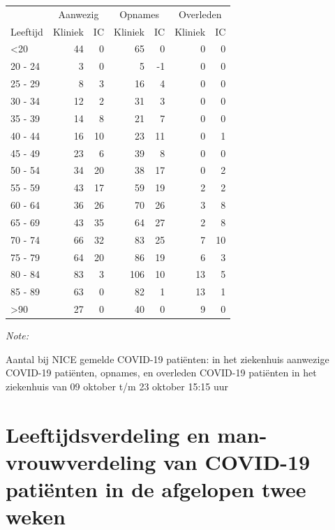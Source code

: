 \documentclass[
  english,
  man,floatsintext]{apa6}
\begin{document}
\begin{table}
\centering\begingroup\fontsize{10}{12}\selectfont

\begin{threeparttable}
\begin{tabular}{lrrrrrr}
\toprule
\multicolumn{1}{c}{ } & \multicolumn{2}{c}{Aanwezig} & \multicolumn{2}{c}{Opnames} & \multicolumn{2}{c}{Overleden} \\
\cmidrule(l{3pt}r{3pt}){2-3} \cmidrule(l{3pt}r{3pt}){4-5} \cmidrule(l{3pt}r{3pt}){6-7}
Leeftijd & Kliniek & IC & Kliniek & IC & Kliniek & IC\\
\midrule
<20 & 44 & 0 & 65 & 0 & 0 & 0\\
20 - 24 & 3 & 0 & 5 & -1 & 0 & 0\\
25 - 29 & 8 & 3 & 16 & 4 & 0 & 0\\
30 - 34 & 12 & 2 & 31 & 3 & 0 & 0\\
35 - 39 & 14 & 8 & 21 & 7 & 0 & 0\\
40 - 44 & 16 & 10 & 23 & 11 & 0 & 1\\
45 - 49 & 23 & 6 & 39 & 8 & 0 & 0\\
50 - 54 & 34 & 20 & 38 & 17 & 0 & 2\\
55 - 59 & 43 & 17 & 59 & 19 & 2 & 2\\
60 - 64 & 36 & 26 & 70 & 26 & 3 & 8\\
65 - 69 & 43 & 35 & 64 & 27 & 2 & 8\\
70 - 74 & 66 & 32 & 83 & 25 & 7 & 10\\
75 - 79 & 64 & 20 & 86 & 19 & 6 & 3\\
80 - 84 & 83 & 3 & 106 & 10 & 13 & 5\\
85 - 89 & 63 & 0 & 82 & 1 & 13 & 1\\
>90 & 27 & 0 & 40 & 0 & 9 & 0\\
\bottomrule
\end{tabular}
\begin{tablenotes}
\item \textit{Note: } 
\item Aantal bij NICE gemelde COVID-19 patiënten: in het ziekenhuis aanwezige COVID-19 patiënten, opnames, en overleden COVID-19 patiënten in het ziekenhuis van 09 oktober t/m 23 oktober 15:15 uur
\end{tablenotes}
\end{threeparttable}
\endgroup{}
\end{table}

\newpage

\hypertarget{leeftijdsverdeling-en-man-vrouwverdeling-van-covid-19-patiuxebnten-in-de-afgelopen-twee-weken}{%
\section{Leeftijdsverdeling en man-vrouwverdeling van COVID-19 patiënten in de afgelopen twee weken}\label{leeftijdsverdeling-en-man-vrouwverdeling-van-covid-19-patiuxebnten-in-de-afgelopen-twee-weken}}
\end{document}
